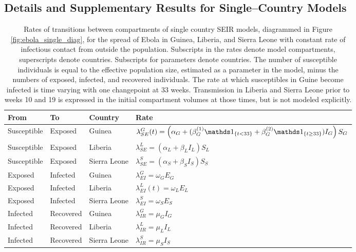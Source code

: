 \subsection{Details and Supplementary Results for Single--Country Models}
\label{subsec:ebola_single_country_supplement}


\begin{table}[htbp]
	\caption[Transmission rates for single country SEIR models for Ebola in West Africa.]{Rates of transitions between compartments of single country SEIR models, diagrammed in Figure \ref{fig:ebola_single_diag}, for the spread of Ebola in Guinea, Liberia, and Sierra Leone with constant rate of infectious contact from outside the population. Subscripts in the rates denote model compartments, superscripts denote countries. Subscripts for parameters denote countries. The number of susceptible individuals is equal to the effective population size, estimated as a parameter in the model, minus the numbers of exposed, infected, and recovered individuals. The rate at which susceptibles in Guine become infected is time varying with one changepoint at 33 weeks. Transmission in Liberia and Sierra Leone prior to weeks 10 and 19 is expressed in the initial compartment volumes at those times, but is not modeled explicitly.}
	\label{tab:ebola_rates_single}
	\centering\footnotesize
	\begin{tabular}{llll}
		\hline
		\textbf{From} & \textbf{To} & \textbf{Country} & \textbf{Rate} \\
		\hline
		Susceptible & Exposed & Guinea & $ \lambda_{SE}^G(t) = \left (\alpha_G + (\beta_G^{(1)} \ind{t<33} + \beta_G^{(2)}\ind{t\geq33})I_G\right )S_G $ \\
		Susceptible & Exposed & Liberia & $ \lambda_{SE}^L = \left (\alpha_L + \beta_LI_L\right )S_L $\\
		Susceptible & Exposed & Sierra Leone & $ \lambda_{SE}^S = \left (\alpha_S + \beta_SI_S\right )S_S $ \\
		Exposed & Infected & Guinea & $ \lambda_{EI}^G = \omega_GE_G $\\
		Exposed & Infected & Liberia & $ \lambda_{EI}^L(t) = \omega_LE_L $ \\
		Exposed & Infected & Sierra Leone & $\lambda_{EI}^S = \omega_SE_S$ \\
		Infected & Recovered & Guinea & $ \lambda_{IR}^G = \mu_GI_G $ \\
		Infected & Recovered & Liberia & $ \lambda_{IR}^L = \mu_LI_L $ \\	
		Infected & Recovered & Sierra Leone & $ \lambda_{IR}^S = \mu_SI_S$ \\
		\hline
	\end{tabular}
\end{table}


